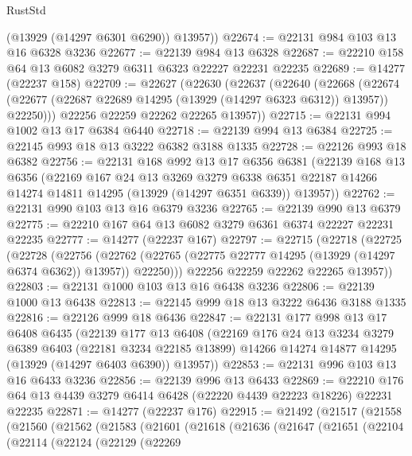 \begin{lexlean}{RustStd}
\begin{coremodule}
        (@13929 (@14297 @6301 @6290))
        @13957))
@22674 := @22131 @984 @103 @13 @16 @6328 @3236
@22677 := @22139 @984 @13 @6328
@22687 := @22210 @158 @64 @13 @6082 @3279 @6311 @6323 @22227 @22231 @22235
@22689 := @14277 (@22237 @158)
@22709 := @22627
    (@22630
      (@22637
        (@22640
          (@22668
            (@22674 (@22677 (@22687 @22689 @14295 (@13929 (@14297 @6323 @6312)) @13957)) @22250)))
        @22256
        @22259
        @22262
        @22265
        @13957))
@22715 := @22131 @994 @1002 @13 @17 @6384 @6440
@22718 := @22139 @994 @13 @6384
@22725 := @22145 @993 @18 @13 @3222 @6382 @3188 @1335
@22728 := @22126 @993 @18 @6382
@22756 := @22131
    @168
    @992
    @13
    @17
    @6356
    @6381
    (@22139
      @168
      @13
      @6356
      (@22169
        @167
        @24
        @13
        @3269
        @3279
        @6338
        @6351
        @22187
        @14266
        @14274
        @14811
        @14295
        (@13929 (@14297 @6351 @6339))
        @13957))
@22762 := @22131 @990 @103 @13 @16 @6379 @3236
@22765 := @22139 @990 @13 @6379
@22775 := @22210 @167 @64 @13 @6082 @3279 @6361 @6374 @22227 @22231 @22235
@22777 := @14277 (@22237 @167)
@22797 := @22715
    (@22718
      (@22725
        (@22728
          (@22756
            (@22762 (@22765 (@22775 @22777 @14295 (@13929 (@14297 @6374 @6362)) @13957)) @22250)))
        @22256
        @22259
        @22262
        @22265
        @13957))
@22803 := @22131 @1000 @103 @13 @16 @6438 @3236
@22806 := @22139 @1000 @13 @6438
@22813 := @22145 @999 @18 @13 @3222 @6436 @3188 @1335
@22816 := @22126 @999 @18 @6436
@22847 := @22131
    @177
    @998
    @13
    @17
    @6408
    @6435
    (@22139
      @177
      @13
      @6408
      (@22169
        @176
        @24
        @13
        @3234
        @3279
        @6389
        @6403
        (@22181 @3234 @22185 @13899)
        @14266
        @14274
        @14877
        @14295
        (@13929 (@14297 @6403 @6390))
        @13957))
@22853 := @22131 @996 @103 @13 @16 @6433 @3236
@22856 := @22139 @996 @13 @6433
@22869 := @22210 @176 @64 @13 @4439 @3279 @6414 @6428 (@22220 @4439 @22223 @18226) @22231 @22235
@22871 := @14277 (@22237 @176)
@22915 := @21492
    (@21517
      (@21558
        (@21560
          (@21562
            (@21583
              (@21601
                (@21618
                  (@21636
                    (@21647
                      (@21651
                        (@22104
                          (@22114
                            (@22124
                              (@22129
                                (@22269

\end{coremodule}
\end{lexlean}
